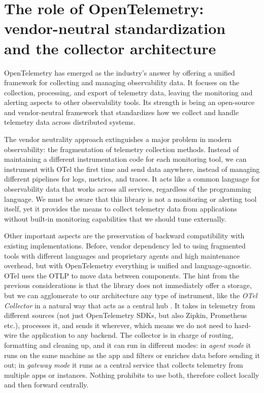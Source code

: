 \documentclass[12pt,a4paper,openright,twoside]{book}
\begin{document}
\section{The role of OpenTelemetry: \\ vendor-neutral standardization \\ and the collector architecture}

OpenTelemetry \cite{OpenTelemetry} has emerged as the industry's answer by offering a unified framework for collecting and managing observability data. It focuses on the collection, processing, and export of telemetry data, leaving the monitoring and alerting aspects to other observability tools. Its strength is being an open-source and vendor-neutral framework that standardizes how we collect and handle telemetry data across distributed systems. 

The vendor neutrality approach extinguishes a major problem in modern observability: the fragmentation of telemetry collection methods. Instead of maintaining a different instrumentation code for each monitoring tool, we can instrument with \ac{OTel} the first time and send data anywhere, instead of managing different pipelines for logs, metrics, and traces. It acts like a common language for observability data that works across all services, regardless of the programming language. We must be aware that this library is not a monitoring or alerting tool itself, yet it provides the means to collect telemetry data from applications without built-in monitoring capabilities that we should tune externally. 

Other important aspects are the preservation of backward compatibility with existing implementations. Before, vendor dependency led to using fragmented tools with different languages and proprietary agents and high maintenance overhead, but with OpenTelemetry everything is unified and language-agnostic. \ac{OTel} uses the \ac{OTLP} to move data between components. The hint from the previous considerations is that the library does not immediately offer a storage, but we can agglomerate to our architecture any type of instrument, like the \textit{OTel Collector} in a natural way that acts as a central hub \cite{OTelCollector}. It takes in telemetry from different sources (not just OpenTelemetry SDKs, but also Zipkin, Prometheus etc.), processes it, and sends it wherever, which means we do not need to hard-wire the application to any backend. The collector is in charge of routing, formatting and cleaning up, and it can run in different modes: in \textit{agent mode} it runs on the same machine as the app and filters or enriches data before sending it out; in \textit{gateway mode} it runs as a central service that collects telemetry from multiple apps or instances. Nothing prohibits to use both, therefore collect locally and then forward centrally. 
\end{document}
